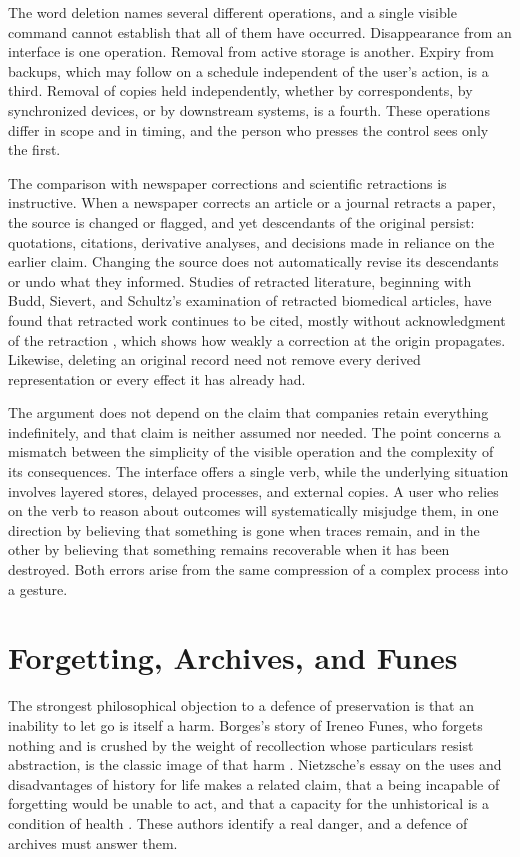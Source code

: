 \documentclass[12pt]{article}
\begin{document}
The word deletion names several different operations, and a single visible command cannot establish that all of them have occurred. Disappearance from an interface is one operation. Removal from active storage is another. Expiry from backups, which may follow on a schedule independent of the user's action, is a third. Removal of copies held independently, whether by correspondents, by synchronized devices, or by downstream systems, is a fourth. These operations differ in scope and in timing, and the person who presses the control sees only the first.

The comparison with newspaper corrections and scientific retractions is instructive. When a newspaper corrects an article or a journal retracts a paper, the source is changed or flagged, and yet descendants of the original persist: quotations, citations, derivative analyses, and decisions made in reliance on the earlier claim. Changing the source does not automatically revise its descendants or undo what they informed. Studies of retracted literature, beginning with Budd, Sievert, and Schultz's examination of retracted biomedical articles, have found that retracted work continues to be cited, mostly without acknowledgment of the retraction \cite{budd1998}, which shows how weakly a correction at the origin propagates. Likewise, deleting an original record need not remove every derived representation or every effect it has already had.

The argument does not depend on the claim that companies retain everything indefinitely, and that claim is neither assumed nor needed. The point concerns a mismatch between the simplicity of the visible operation and the complexity of its consequences. The interface offers a single verb, while the underlying situation involves layered stores, delayed processes, and external copies. A user who relies on the verb to reason about outcomes will systematically misjudge them, in one direction by believing that something is gone when traces remain, and in the other by believing that something remains recoverable when it has been destroyed. Both errors arise from the same compression of a complex process into a gesture.

\section{Forgetting, Archives, and Funes}

The strongest philosophical objection to a defence of preservation is that an inability to let go is itself a harm. Borges's story of Ireneo Funes, who forgets nothing and is crushed by the weight of recollection whose particulars resist abstraction, is the classic image of that harm \cite{borges1944}. Nietzsche's essay on the uses and disadvantages of history for life makes a related claim, that a being incapable of forgetting would be unable to act, and that a capacity for the unhistorical is a condition of health \cite{nietzsche1874}. These authors identify a real danger, and a defence of archives must answer them.
\end{document}
